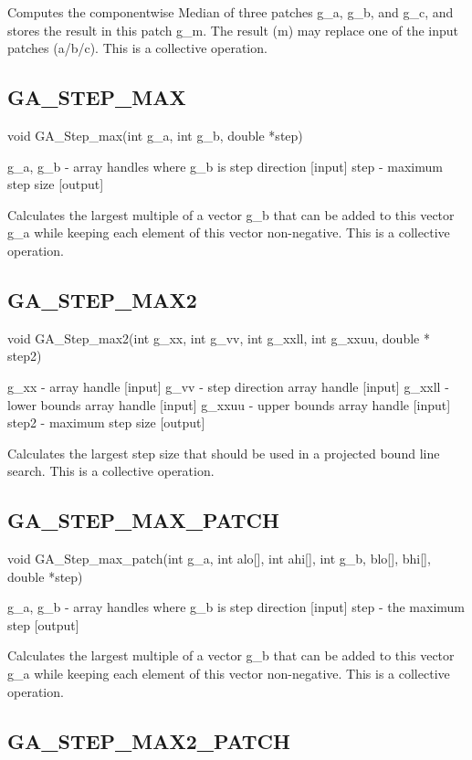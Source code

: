 Computes the componentwise Median of three patches g\_a, g\_b, and
g\_c, and stores the result in this patch g\_m. The result (m) may
replace one of the input patches (a/b/c). This is a collective operation. 


\subsection*{GA\_STEP\_MAX}

void GA\_Step\_max(int g\_a, int g\_b, double {*}step)

g\_a, g\_b - array handles where g\_b is step direction {[}input{]}
step - maximum step size {[}output{]}

Calculates the largest multiple of a vector g\_b that can be added
to this vector g\_a while keeping each element of this vector non-negative.
This is a collective operation. 


\subsection*{GA\_STEP\_MAX2}

void GA\_Step\_max2(int g\_xx, int g\_vv, int g\_xxll, int g\_xxuu,
double {*} step2)

g\_xx - array handle {[}input{]} g\_vv - step direction array handle
{[}input{]} g\_xxll - lower bounds array handle {[}input{]} g\_xxuu
- upper bounds array handle {[}input{]} step2 - maximum step size
{[}output{]}

Calculates the largest step size that should be used in a projected
bound line search. This is a collective operation. 


\subsection*{GA\_STEP\_MAX\_PATCH}

void GA\_Step\_max\_patch(int g\_a, int alo{[}{]}, int ahi{[}{]},
int g\_b, blo{[}{]}, bhi{[}{]}, double {*}step)

g\_a, g\_b - array handles where g\_b is step direction {[}input{]}
step - the maximum step {[}output{]}

Calculates the largest multiple of a vector g\_b that can be added
to this vector g\_a while keeping each element of this vector non-negative.
This is a collective operation.


\subsection*{GA\_STEP\_MAX2\_PATCH}

